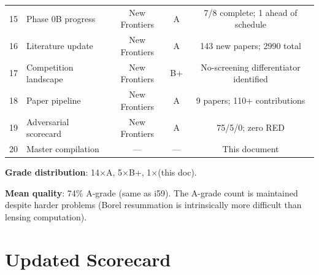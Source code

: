 \documentclass[11pt,a4paper]{article}
\begin{document}
\begin{center}
\begin{longtable}{clccc}
15 & Phase 0B progress & New Frontiers & A & 7/8 complete; 1 ahead of schedule \\
16 & Literature update & New Frontiers & A & 143 new papers; 2990 total \\
17 & Competition landscape & New Frontiers & B+ & No-screening differentiator identified \\
18 & Paper pipeline & New Frontiers & A & 9 papers; 110+ contributions \\
19 & Adversarial scorecard & New Frontiers & A & 75/5/0; zero RED \\
20 & Master compilation & --- & --- & This document \\
\bottomrule
\end{longtable}
\end{center}

\textbf{Grade distribution}: 14$\times$A, 5$\times$B+, 1$\times$(this doc).

\textbf{Mean quality}: 74\% A-grade (same as i59). The A-grade count is maintained despite harder problems (Borel resummation is intrinsically more difficult than lensing computation).


\section{Updated Scorecard}
\label{sec:scorecard}
\end{document}
